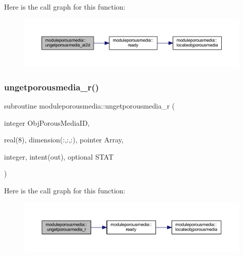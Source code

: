 Here is the call graph for this function\+:\nopagebreak
\begin{figure}[H]
\begin{center}
\leavevmode
\includegraphics[width=350pt]{namespacemoduleporousmedia_a287c849b30a2dc7af1280cf983edfb8d_cgraph}
\end{center}
\end{figure}
\mbox{\label{namespacemoduleporousmedia_a762615c8c034a45d738dd8a156eeed72}} 
\subsubsection{\texorpdfstring{ungetporousmedia\+\_\+r()}{ungetporousmedia\_r()}}
{\footnotesize\ttfamily subroutine moduleporousmedia\+::ungetporousmedia\+\_\+r (\begin{DoxyParamCaption}\item[{integer}]{Obj\+Porous\+Media\+ID,  }\item[{real(8), dimension(\+:,\+:,\+:), pointer}]{Array,  }\item[{integer, intent(out), optional}]{S\+T\+AT }\end{DoxyParamCaption})\hspace{0.3cm}{\ttfamily [private]}}

Here is the call graph for this function\+:\nopagebreak
\begin{figure}[H]
\begin{center}
\leavevmode
\includegraphics[width=350pt]{namespacemoduleporousmedia_a762615c8c034a45d738dd8a156eeed72_cgraph}
\end{center}
\end{figure}
\mbox{\label{namespacemoduleporousmedia_ac6425bf5e26a5219b8c52bbabeda12ce}} 
